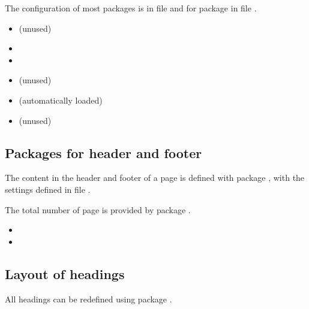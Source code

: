 The configuration of most packages is in file  and 
for package  in file .


\begin{itemize}[noitemsep]
\item {} (unused)
\item {}
\item {}
\item {} (unused)
\item {} (automatically loaded)
\item {} (unused)
\end{itemize}


\subsection{Packages for header and footer}

The content in the header and footer of a page is defined with package 
, with the settings defined in file 
.

The total number of page is provided by package .

\begin{itemize}[noitemsep]
\item {}
\item {}
\end{itemize}


\subsection{Layout of headings}

All headings can be redefined using package .


